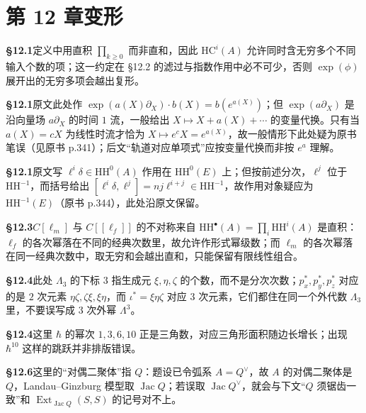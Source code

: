 \section*{第 12 章\quad 变形}
\noindent\textbf{§12.1}\quad 定义中用直积 $\prod_{k\geq0}$ 而非直和，因此 $\mathrm{HC}^{i}(A)$ 允许同时含无穷多个不同输入个数的项；这一约定在 §12.2 的滤过与指数作用中必不可少，否则 $\exp(\phi)$ 展开出的无穷多项会越出复形。\par\medskip
\noindent\textbf{§12.1}\quad 原文此处作 $\exp(a(X)\partial_X)\cdot b(X)=b(e^{a(X)})$；但 $\exp(a\partial_X)$ 是沿向量场 $a\partial_X$ 的时间 $1$ 流，一般给出 $X\mapsto X+a(X)+\cdots$ 的变量代换。只有当 $a(X)=cX$ 为线性时流才恰为 $X\mapsto e^{c}X=e^{a(X)}$，故一般情形下此处疑为原书笔误（见原书 p.341）；后文“轨道对应单项式”应按变量代换而非按 $e^{a}$ 理解。\par\medskip
\noindent\textbf{§12.1}\quad 原文写 $\ell^i\delta\in\mathrm{HH}^{0}(A)$ 作用在 $\mathrm{HH}^{0}(E)$ 上；但按前述分次，$\ell^j$ 位于 $\mathrm{HH}^{-1}$，而括号给出 $[\ell^i\delta,\ell^j]=nj\ell^{i+j}\in\mathrm{HH}^{-1}$，故作用对象疑应为 $\mathrm{HH}^{-1}(E)$（原书 p.344），此处沿原文保留。\par\medskip
\noindent\textbf{§12.3}\quad $C[\ell_m]$ 与 $C[[\ell_f]]$ 的不对称来自 $\mathrm{HH}^{\bullet}(A)=\prod_i\mathrm{HH}^{i}(A)$ 是直积：$\ell_f$ 的各次幂落在不同的经典次数里，故允许作形式幂级数；而 $\ell_m$ 的各次幂落在同一经典次数中，取无穷和会越出直和，只能保留有限线性组合。\par\medskip
\noindent\textbf{§12.4}\quad 此处 $\Lambda_3$ 的下标 $3$ 指生成元 $\xi,\eta,\zeta$ 的个数，而不是分次次数；$p_x^*,p_y^*,p_z^*$ 对应的是 $2$ 次元素 $\eta\zeta,\zeta\xi,\xi\eta$，而 $\iota^*=\xi\eta\zeta$ 对应 $3$ 次元素，它们都住在同一个外代数 $\Lambda_3$ 里，不要误写成 3 次外幂 $\Lambda^3$。\par\medskip
\noindent\textbf{§12.4}\quad 这里 $\hbar$ 的幂次 $1,3,6,10$ 正是三角数，对应三角形面积随边长增长；出现 $\hbar^{10}$ 这样的跳跃并非排版错误。\par\medskip
\noindent\textbf{§12.6}\quad 这里的“对偶二聚体”指 $Q$：题设已令弧系 $A=Q^{\vee}$，故 $A$ 的对偶二聚体是 $Q$，Landau--Ginzburg 模型取 $\operatorname{Jac}Q$；若误取 $\operatorname{Jac}Q^{\vee}$，就会与下文“$Q$ 须锯齿一致”和 $\operatorname{Ext}_{\operatorname{Jac}Q}(S,S)$ 的记号对不上。\par\medskip
